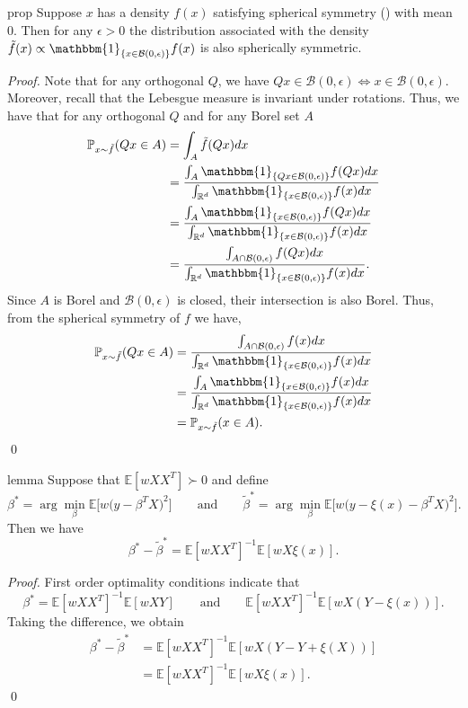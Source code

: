 \documentclass[11pt]{article}
\begin{document}
\begin{restatable}{prop}{} \label{prop: conditional spherical symmetry}
    Suppose $x$ has a density $f(x)$ satisfying spherical symmetry () with mean $0$. Then for any $\epsilon > 0$ the distribution associated with the density $\tilde{f}(x) \propto \mathbbm{1}_{\{x \in \mathcal{B}(0, \epsilon)\}}f(x)$ is also spherically symmetric. 
\end{restatable}
\noindent \textit{Proof.} Note that for any orthogonal $Q$, we have $Qx \in \mathcal{B}(0, \epsilon) \iff x \in \mathcal{B}(0, \epsilon)$. Moreover, recall that the Lebesgue measure is invariant under rotations. Thus, we have that for any orthogonal $Q$ and for any Borel set $A$
\begin{align*}
    \mathbb{P}_{x \sim \tilde f}(Qx \in A) &= \int_{A}\tilde{f}(Qx)dx \\
    &= \frac{\int_{A}\mathbbm{1}_{\{Qx \in \mathcal{B}(0,\epsilon)\}} f(Qx)dx}{\int_{\mathbb{R}^d}\mathbbm{1}_{\{x \in \mathcal{B}(0, \epsilon)\}}f(x) dx} \\
    &= \frac{\int_{A}\mathbbm{1}_{\{x \in \mathcal{B}(0,\epsilon)\}} f(Qx)dx}{\int_{\mathbb{R}^d}\mathbbm{1}_{\{x \in \mathcal{B}(0, \epsilon)\}}f(x) dx} \\
    &= \frac{\int_{A\cap \mathcal{B}(0, \epsilon)}f(Qx)dx}{\int_{\mathbb{R}^d}\mathbbm{1}_{\{x \in \mathcal{B}(0, \epsilon)\}}f(x) dx}.
\end{align*}
Since $A$ is Borel and $\mathcal{B}(0, \epsilon)$ is closed, their intersection is also Borel. Thus, from the spherical symmetry of $f$ we have,
\begin{align*}
    \mathbb{P}_{x \sim \tilde f}(Qx \in A) &= \frac{\int_{A\cap \mathcal{B}(0, \epsilon)}f(x)dx}{\int_{\mathbb{R}^d}\mathbbm{1}_{\{x \in \mathcal{B}(0, \epsilon)\}}f(x) dx} \\
    &= \frac{\int_{A}\mathbbm{1}_{\{x \in \mathcal{B}(0, \epsilon)\}}f(x)dx}{\int_{\mathbb{R}^d}\mathbbm{1}_{\{x \in \mathcal{B}(0, \epsilon)\}}f(x) dx} \\
    &= \mathbb{P}_{x \sim \tilde f}(x \in A).
\end{align*}
\qed{}

\begin{restatable}[Perturbation]{lemma}{} \label{lemma: perturbation}
    Suppose that $\mathbb{E}[wXX^T] \succ 0$ and define  
    \[\beta^* = \arg\min_{\beta}\mathbb{E}\big[w\big(y - \beta^{T}X\big)^2\big] \qquad \text{and} \qquad \tilde{\beta}^* = \arg\min_{\beta}\mathbb{E}\big[w\big(y - \xi(x) - \beta^{T}X\big)^2\big].\]
    Then we have
    \[\beta^* - \tilde{\beta}^* = \mathbb{E}[wXX^{T}]^{-1}\mathbb{E}[wX\xi(x)].\]
\end{restatable}
\noindent \textit{Proof.} First order optimality conditions indicate that 
\[\beta^* = \mathbb{E}[wXX^{T}]^{-1}\mathbb{E}[wXY] \qquad \text{and} \qquad \mathbb{E}[wXX^{T}]^{-1}\mathbb{E}[wX(Y - \xi(x))].\]
Taking the difference, we obtain
\begin{align*}
    \beta^* - \tilde{\beta}^* &= \mathbb{E}[wXX^{T}]^{-1}\mathbb{E}[wX(Y -  Y + \xi(X) )] \\
    &= \mathbb{E}[wXX^{T}]^{-1}\mathbb{E}[wX\xi(x)].
\end{align*}
\qed{}
\end{document}
